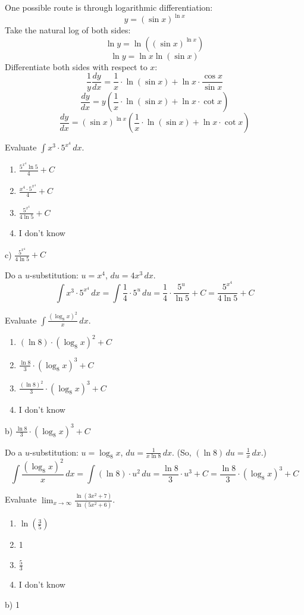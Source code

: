 \documentclass[addpoints,12pt,answers]{exam}
\begin{document}
\begin{questions}
\begin{solution}
    One possible route is through logarithmic differentiation:
    $$y=(\sin x)^{\ln x}$$
    Take the natural log of both sides:
    $$\ln y=\ln\left((\sin x)^{\ln x}\right)$$
    $$\ln y=\ln x\ln(\sin x)$$
    Differentiate both sides with respect to $x$:
    $$\frac{1}{y}\frac{dy}{dx}=\frac{1}{x}\cdot\ln(\sin x)+\ln x\cdot\frac{\cos x}{\sin x}$$
    $$\frac{dy}{dx}=y\left(\frac{1}{x}\cdot\ln(\sin x)+\ln x\cdot\cot x\right)$$
    $$\frac{dy}{dx}=(\sin x)^{\ln x}\left(\frac{1}{x}\cdot\ln(\sin x)+\ln x\cdot\cot x\right)$$
  \end{solution}
  \newpage
  \question
  Evaluate $\displaystyle\int x^3\cdot 5^{x^4}\,dx$.
  \begin{enumerate}[label=\alph*)]
    \item
    $\displaystyle\frac{5^{x^4}\ln 5}{4}+C$
    \item
    $\displaystyle\frac{x^4\cdot 5^{x^4}}{4}+C$
    \item
    $\displaystyle\frac{5^{x^4}}{4\ln 5}+C$
    \item
    I don't know
  \end{enumerate}
  \begin{solution}
    c) $\displaystyle\frac{5^{x^4}}{4\ln 5}+C$
    
    Do a $u$-substitution: $u=x^4$, $du=4x^3\,dx$.
    $$\int x^3\cdot 5^{x^4}\,dx=\int\frac{1}{4}\cdot 5^u\,du=\frac{1}{4}\cdot\frac{5^u}{\ln 5}+C=\frac{5^{x^4}}{4\ln 5}+C$$
  \end{solution}
  \newpage
  \question
  Evaluate $\displaystyle\int\frac{(\log_8 x)^2}{x}\,dx$.
  \begin{enumerate}[label=\alph*)]
    \item
    $\displaystyle(\ln 8)\cdot(\log_8 x)^2+C$
    \item
    $\displaystyle\frac{\ln 8}{3}\cdot(\log_8 x)^3+C$
    \item
    $\displaystyle\frac{(\ln 8)^2}{3}\cdot(\log_8 x)^3+C$
    \item
    I don't know
  \end{enumerate}
  \begin{solution}
    b) $\displaystyle\frac{\ln 8}{3}\cdot(\log_8 x)^3+C$
    
    Do a $u$-substitution: $u=\log_8 x$, $\displaystyle du=\frac{1}{x\ln 8}\,dx$. (So, $\displaystyle(\ln 8)\,du=\frac{1}{x}\,dx$.)
    $$\int\frac{(\log_8 x)^2}{x}\,dx=\int(\ln 8)\cdot u^2\,du=\frac{\ln 8}{3}\cdot u^3+C=\frac{\ln 8}{3}\cdot(\log_8 x)^3+C$$
  \end{solution}
  \newpage
  \question
  Evaluate $\displaystyle\lim_{x\to\infty}\frac{\ln(3x^2+7)}{\ln(5x^2+6)}$.
  \begin{enumerate}[label=\alph*)]
    \item
    $\displaystyle\ln\left(\frac{3}{5}\right)$
    \item
    1
    \item
    $\displaystyle\frac{5}{3}$
    \item
    I don't know
  \end{enumerate}
  \begin{solution}
    b) 1
    

\end{solution}
\end{questions}
\end{document}
